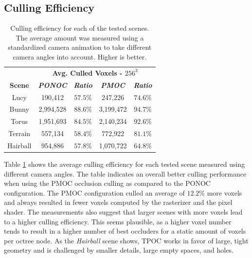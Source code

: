 \documentclass[conference]{IEEEtran}
\begin{document}
\subsection{Culling Efficiency} \label{subsec-culling-efficiency}

\begin{table}[htbp]
    \caption{Culling efficiency for each of the tested scenes. The average amount was measured using a 
    standardized camera animation to take different camera angles into account. Higher is better.}
    \begin{center}
        \begin{tabular}{|c|cc|cc|}
            \hline
            \textbf{}&\multicolumn{4}{|c|}{\textbf{Avg. Culled Voxels - $256^3$}} \\
            \cline{2-5} 
            \textbf{Scene} & \textbf{\textit{\ac{PONOC}}} & \textbf{\textit{Ratio}} & \textbf{\textit{\ac{PMOC}}} & \textbf{\textit{Ratio}} \\
            \hline
            Lucy        &  190,412      & $57.5 \%$    & 247,226        & $74.6 \%$     \\
            Bunny       &  2,994,528    & $88.6 \%$    & 3,199,472      & $94.7 \%$     \\
            Torus       &  1,951,693    & $84.5 \%$    & 2,140,234      & $92.6 \%$     \\
            Terrain     &  557,134      & $58.4 \%$    & 772,922        & $81.1 \%$     \\
            Hairball    &  954,886      & $57.8 \%$    & 1,070,722      & $64.8 \%$     \\
            \hline
        \end{tabular}
    \label{tab:culling-efficiency}
    \end{center}
\end{table}

\noindent
Table \ref{tab:culling-efficiency} shows the average culling efficiency for each tested scene measured using 
different camera angles. The table indicates an overall better culling performance when using the \ac{PMOC} 
occlusion culling as compared to the \ac{PONOC} configuration. The \ac{PMOC} configuration culled 
an average of $12.2 \%$ more voxels and always resulted in fewer voxels computed by the rasterizer and the 
pixel shader. The measurements also suggest that larger scenes with more voxels lead to a higher culling 
efficiency. This seems plausible, as a higher voxel number tends to result in a higher number of best occluders 
for a static amount of voxels per octree node. As the \emph{Hairball} scene shows, \ac{TPOC} works in favor 
of large, tight geometry and is challenged by smaller details, large empty spaces, and holes.
\end{document}
